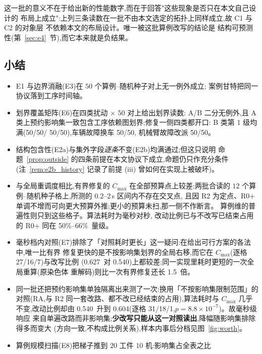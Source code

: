 \documentclass[manuscript,screen,review]{acmart}
\newcommand{\NPairs}{50}
\newcommand{\ResFracRtwo}{50\%--66\%}
\newcommand{\EfiveCells}{12}        %
\newcommand{\RedecodeRatio}{1.5}     %
\newcommand{\WinVsShift}{27/16/7}    %
\newcommand{\ResFracCheapRtwo}{0.540}
\newcommand{\ResFracShift}{0.627}
\newcommand{\ResFracAllFuture}{0.604}
\newcommand{\RAStabWTL}{31/18/1}     %
\newcommand{\RAStabP}{8.8\times10^{-7}}  %
\newcommand{\ScaleJobsHi}{20}
\newcommand{\ScaleMachHi}{10}
\newcommand{\FeasESixBlock}{\NPairs/\NPairs}
\newcommand{\FeasSlow}{\NPairs/\NPairs}
\newcommand{\FeasESixAgv}{\NPairs/\NPairs}
\newcommand{\FeasESixRa}{\NPairs/\NPairs}
\begin{document}
这一批的意义不在于给出新的性能数字,而在于回答"这些现象是否只在本文自己设计的
布局上成立":上列三条读数在一批不由本文选定的拓扑上同样成立,故 C1 与 C2 的对象层
不依赖本文的布局设计。唯一被这批算例改写的结论是
结构可预测性(第~\ref{sec:e4}~节),而它本来就是负结果。

\subsection{小结}
\label{sec:exp_summary}

\begin{itemize}[leftmargin=1.5em,itemsep=0.25em]
\item E1 与边界消融(E3)在 \(\NPairs\) 个算例--随机种子对上无一例外成立;
案例甘特把同一协议落到工序时间轴。
\item 划界覆盖矩阵(E6)在四类扰动 \(\times\) \(\NPairs\) 对上给出划界读数:
A/B 二分无例外,且 A 类上预约影响集一致包含工序依赖图划界;修复一侧四类都开口:
B 类第 1 级均满(\FeasESixBlock / \FeasSlow),车辆故障换车 \FeasESixAgv,
机械臂故障改派 \FeasESixRa。
\item 结构包含性(E2a)与集外字段\emph{逐条}不变(E2b)均满通过;但这只说明
命题~\ref{prop:outside} 的四条前提在本文协议下成立,命题仍只作充分条件
(注~\ref{rem:e2b_history} 记录了前提 (iii) 曾如何在实现上被破坏)。
\item 与全局重调度相比,有界修复的 \(C_{\max}\) 在全部预算点上较差;两批合读的
\(\EfiveCells\) 个算例--随机种子格上,所测的 \(0.2\)--\(2\)\,s 区间内不存在交叉点,
且因 R2 为定点、R0+ 单调不增而可向更大预算外推;更小的预算未扫,那一侧不作断言。
算例维的普遍性则只到这些格子。算法耗时为毫秒对秒,
改动比例已与不改写已结束占用的 R0+ 同在 \ResFracRtwo\ 量级。
\item 毫秒档内对照(E7)排除了「对照耗时更长」这一疑问:在给出可行方案的各法中,唯一比有界
修复更快的是不按影响集划界的全局右移,而它在 \(C_{\max}\)(逐格 \WinVsShift)与改写比例
(\ResFracShift\ 对 \ResFracCheapRtwo)上都较差;同一实现里耗时更短的一次全局重算(原染色体
重解码)则比一次有界修复还长 \RedecodeRatio\ 倍。
\item 同一批还把预约影响集单独隔离出来测了一次:换用「不按影响集限制范围」的对照(RA,与 R2
同一套改路、都不改已经结束的占用),算法耗时与 \(C_{\max}\) 几乎不变,改动比例却由
\ResFracCheapRtwo\ 升到 \ResFracAllFuture(逐格 \RAStabWTL,\(p=\RAStabP\))。故毫秒级响应
来自单遍改路而非影响集;\textbf{少改写只能从这一对照读出},降幅随影响集排除得多而变大
(方向一致,不构成比例关系),样本内事后分档见图~\ref{fig:worth}。
\item 算例规模扫描(E8)把梯子推到 \(\ScaleJobsHi\) 工件 \(\ScaleMachHi\) 机:影响集占全表之比

\end{itemize}
\end{document}
